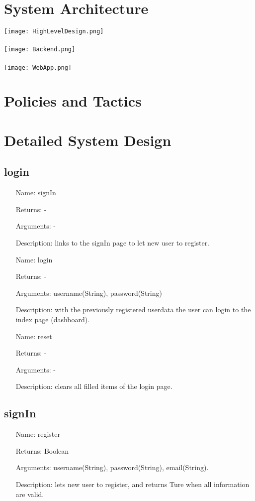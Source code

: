 \documentclass[runningheads]{llncs}
\begin{document}
\section{System Architecture}
\texttt{[image: HighLevelDesign.png]} \\ \ \\
\texttt{[image: Backend.png]} \\ \ \\
\texttt{[image: WebApp.png]}
\section{Policies and Tactics}

\section{Detailed System Design}
\subsection{login}
\begin{itemize}
	\item[Name:] signIn
	\item[Returns:] -
	\item[Arguments:] -
	\item[Description:] links to the signIn page to let new user to register.
\end{itemize}

\begin{itemize}
	\item[Name:] login
	\item[Returns:] -
	\item[Arguments:] username(String), password(String)
	\item[Description:] with the previously registered userdata the user can login to the index page (dashboard).
\end{itemize}

\begin{itemize}
	\item[Name:] reset
	\item[Returns:] -
	\item[Arguments:] -
	\item[Description:] clears all filled items of the login page.
\end{itemize}

\subsection{signIn}
\begin{itemize}
	\item[Name:] register
	\item[Returns:] Boolean
	\item[Arguments:] username(String), password(String), email(String).
	\item[Description:] lets new user to register, and returns Ture when all information are valid.
\end{itemize}
\end{document}
